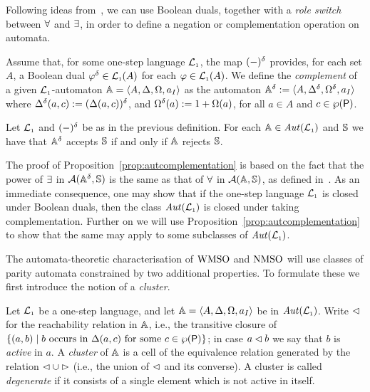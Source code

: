 Following ideas from~\cite{Muller1987,DBLP:conf/calco/KissigV09}, we can use
Boolean duals, together with a \emph{role switch} between $\forall$ and
$\exists$, in order to define a negation or complementation operation on 
automata.

\begin{definition}
\label{d:caut}
Assume that, for some one-step language $\mathcal{L}_{\scriptscriptstyle 1}$, the map $(-)^{\delta}$
provides, for each set $A$, a Boolean dual $\varphi^{\delta} \in \mathcal{L}_{\scriptscriptstyle 1}(A)$ for each
$\varphi \in \mathcal{L}_{\scriptscriptstyle 1}(A)$.
We define the \emph{complement} of a given $\mathcal{L}_{\scriptscriptstyle 1}$-automaton 
$\mathbb{A} = \langle{A,\Delta,\Omega,a_I}\rangle$ as the automaton $\mathbb{A}^{\delta} \mathrel{:=} 
\langle{A,\Delta^{\delta},\Omega^{\delta},a_I}\rangle$ where $\Delta^{\delta}(a,c) \mathrel{:=}
(\Delta(a,c))^{\delta}$, and $\Omega^{\delta}(a) \mathrel{:=} 1 + \Omega(a)$, for all 
$a \in A$ and $c \in \wp(\mathsf{P})$.
\end{definition}

\begin{proposition}
\label{prop:autcomplementation}
Let $\mathcal{L}_{\scriptscriptstyle 1}$ and $(-)^{\delta}$ be as in the previous definition.
For each $\mathbb{A} \in \mathit{Aut}(\mathcal{L}_{\scriptscriptstyle 1})$ and $\mathbb{S}$ we have that $\mathbb{A}^{\delta}$ accepts
$\mathbb{S}$ if and only if $\mathbb{A}$ rejects $\mathbb{S}$.
\end{proposition}

The proof of Proposition~\ref{prop:autcomplementation} is based on the fact
that the power of $\exists$ in $\mathcal{A}(\mathbb{A}^{\delta},\mathbb{S})$ is the same
as that of $\forall$ in $\mathcal{A}(\mathbb{A},\mathbb{S})$, as defined 
in~\cite{DBLP:conf/calco/KissigV09}. 
As an immediate consequence, one may show that if the one-step language $\mathcal{L}_{\scriptscriptstyle 1}$
is closed under Boolean duals, then the class $\mathit{Aut}(\mathcal{L}_{\scriptscriptstyle 1})$ is closed under 
taking complementation.
Further on we will use Proposition~\ref{prop:autcomplementation} to show that
the same may apply to some subclasses of $\mathit{Aut}(\mathcal{L}_{\scriptscriptstyle 1})$.

The automata-theoretic characterisation of $\mathrm{WMSO}$ and $\mathrm{NMSO}$ will use classes 
of parity automata constrained by two additional properties.
To formulate these we first introduce the notion of a \emph{cluster}.

\begin{definition}
\label{d:wk}
\label{d:ctwk}
Let $\mathcal{L}_{\scriptscriptstyle 1}$ be a one-step language, and let $\mathbb{A} = \langle{A,\Delta,\Omega,a_I}\rangle$
be in $\mathit{Aut}(\mathcal{L}_{\scriptscriptstyle 1})$. 
Write $\lhd$ for the reachability relation in $\mathbb{A}$, i.e., the transitive 
closure of $\{ (a,b) \mid b \text{ occurs in }\tmap(a,c) \text{ for 
some } c \in \wp(\props) \}$;
in case $a \lhd b$ we say that $b$ is \emph{active} in $a$.
A \emph{cluster} of $\mathbb{A}$ is a cell of the equivalence relation generated by 
the relation $\lhd \cup \rhd$ (i.e., the union of $\lhd$ and its converse).
A cluster is called \emph{degenerate} if it consists of a  single element which
is not active in itself.
\end{definition}

